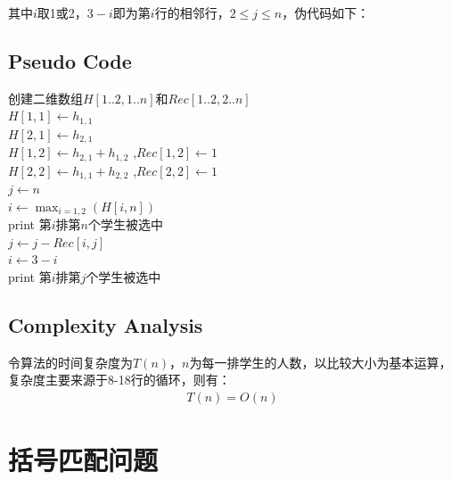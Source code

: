 \documentclass{ctexart}
\begin{document}
其中$i$取1或2，$3-i$即为第$i$行的相邻行，$2 \leq j \leq n$，伪代码如下：



\subsection{Pseudo Code}

\begin{algorithm}[H]
    \SetAlgoLined %
	\caption{$HighestQueue(h_{i,j})$}%
	\BlankLine
	\BlankLine
	创建二维数组$H[1..2,1..n]$和$Rec[1..2,2..n]$ \\
	$H[1,1] \leftarrow h_{1,1}$ \\
	$H[2,1] \leftarrow h_{2,1}$ \\
	$H[1,2] \leftarrow h_{2,1}+h_{1,2}$ ,$Rec[1,2] \leftarrow 1$ \\
	$H[2,2] \leftarrow h_{1,1}+h_{2,2}$ ,$Rec[2,2] \leftarrow 1$ \\
	{
	{
	}
	}
	$j \leftarrow n$ \\
	$i \leftarrow \max_{i=1,2}(H[i,n])$ \\
	print 第$i$排第$n$个学生被选中 \\
	{
	$j \leftarrow j-Rec[i,j]$ \\
	$i \leftarrow 3-i$ \\
		print 第$i$排第$j$个学生被选中 \\
	}
\end{algorithm}

\subsection{Complexity Analysis}
令算法的时间复杂度为$T(n)$，$n$为每一排学生的人数，以比较大小为基本运算，复杂度主要来源于8-18行的循环，则有：
\begin{align*}
    T(n)=O(n)
\end{align*}
\section{括号匹配问题}
\end{document}
